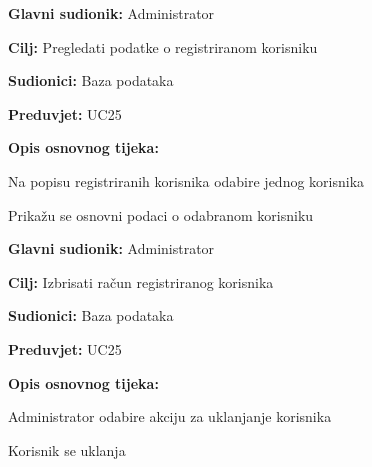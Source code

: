 \noindent {}
\begin{packed_item}
	
	\item \textbf{Glavni sudionik:} Administrator
	\item  \textbf{Cilj:} Pregledati podatke o registriranom korisniku
	\item  \textbf{Sudionici:} Baza podataka
	\item  \textbf{Preduvjet:} UC25
	\item  \textbf{Opis osnovnog tijeka:}
	
	\item[] \begin{packed_enum}

		\item Na popisu registriranih korisnika odabire jednog korisnika
		\item Prikažu se osnovni podaci o odabranom korisniku

	\end{packed_enum}
\end{packed_item}



\pagebreak\noindent {}
\begin{packed_item}
	
	\item \textbf{Glavni sudionik:} Administrator
	\item  \textbf{Cilj:} Izbrisati račun registriranog korisnika
	\item  \textbf{Sudionici:} Baza podataka
	\item  \textbf{Preduvjet:} UC25
	\item  \textbf{Opis osnovnog tijeka:}
	
	\item[] \begin{packed_enum}

		\item Administrator odabire akciju za uklanjanje korisnika
		\item Korisnik se uklanja

	\end{packed_enum}
\end{packed_item}



\pagebreak

